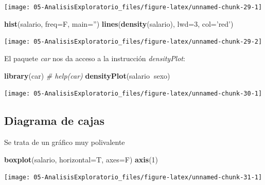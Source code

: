 \documentclass[]{book}
\newenvironment{Shaded}{\begin{snugshade}}{\end{snugshade}}
\newcommand{\CommentTok}[1]{\textcolor[rgb]{0.56,0.35,0.01}{\textit{#1}}}
\newcommand{\DataTypeTok}[1]{\textcolor[rgb]{0.13,0.29,0.53}{#1}}
\newcommand{\DecValTok}[1]{\textcolor[rgb]{0.00,0.00,0.81}{#1}}
\newcommand{\KeywordTok}[1]{\textcolor[rgb]{0.13,0.29,0.53}{\textbf{#1}}}
\newcommand{\NormalTok}[1]{#1}
\newcommand{\OperatorTok}[1]{\textcolor[rgb]{0.81,0.36,0.00}{\textbf{#1}}}
\newcommand{\StringTok}[1]{\textcolor[rgb]{0.31,0.60,0.02}{#1}}
\begin{document}
\begin{center}\texttt{[image: 05-AnalisisExploratorio\_files/figure-latex/unnamed-chunk-29-1]} \end{center}

\begin{Shaded}
\begin{Highlighting}[]
\KeywordTok{hist}\NormalTok{(salario, }\DataTypeTok{freq=}\NormalTok{F, }\DataTypeTok{main=}\StringTok{''}\NormalTok{)}
\KeywordTok{lines}\NormalTok{(}\KeywordTok{density}\NormalTok{(salario), }\DataTypeTok{lwd=}\DecValTok{3}\NormalTok{, }\DataTypeTok{col=}\StringTok{'red'}\NormalTok{)}
\end{Highlighting}
\end{Shaded}

\begin{center}\texttt{[image: 05-AnalisisExploratorio\_files/figure-latex/unnamed-chunk-29-2]} \end{center}

El paquete \emph{car} nos da acceso a la instrucción \emph{densityPlot}:

\begin{Shaded}
\begin{Highlighting}[]
\KeywordTok{library}\NormalTok{(car)  }\CommentTok{# help(car)}
\KeywordTok{densityPlot}\NormalTok{(salario}\OperatorTok{~}\NormalTok{sexo)}
\end{Highlighting}
\end{Shaded}

\begin{center}\texttt{[image: 05-AnalisisExploratorio\_files/figure-latex/unnamed-chunk-30-1]} \end{center}

\hypertarget{diagrama-de-cajas}{%
\subsection{Diagrama de cajas}\label{diagrama-de-cajas}}

Se trata de un gráfico muy polivalente

\begin{Shaded}
\begin{Highlighting}[]
\KeywordTok{boxplot}\NormalTok{(salario, }\DataTypeTok{horizontal=}\NormalTok{T, }\DataTypeTok{axes=}\NormalTok{F)}
\KeywordTok{axis}\NormalTok{(}\DecValTok{1}\NormalTok{)}
\end{Highlighting}
\end{Shaded}

\begin{center}\texttt{[image: 05-AnalisisExploratorio\_files/figure-latex/unnamed-chunk-31-1]} \end{center}
\end{document}
